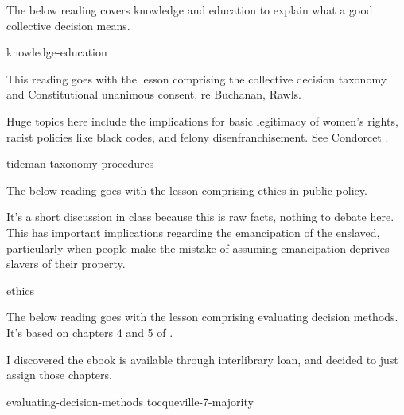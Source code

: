 

\begin{boxcomment}
    The below reading covers knowledge and education to explain what a good collective decision means.
\end{boxcomment}
{knowledge-education}

\begin{boxcomment}
    This reading goes with the lesson comprising the collective decision taxonomy and Constitutional unanimous consent, re Buchanan, Rawls.

    Huge topics here include the implications for basic legitimacy of women's rights, racist policies like black codes, and felony disenfranchisement.  See Condorcet \autocite{Condorcet1789}.
\end{boxcomment}
{tideman-taxonomy-procedures}

\begin{boxcomment}
    The below reading goes with the lesson comprising ethics in public policy.

    It's a short discussion in class because this is raw facts, nothing to debate here.  This has important implications regarding the emancipation of the enslaved, particularly when people make the mistake of assuming emancipation deprives slavers of their property.
\end{boxcomment}
{ethics}

\begin{boxcomment}
    The below reading goes with the lesson comprising evaluating decision methods.  It's based on chapters 4 and 5 of \autocite{Tideman2006}.

    I discovered the ebook is available through interlibrary loan, and decided to just assign those chapters.
\end{boxcomment}
{evaluating-decision-methods}
{tocqueville-7-majority}
